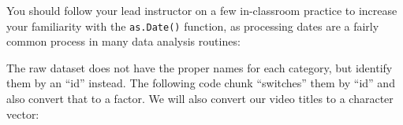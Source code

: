 \documentclass[]{article}
\newenvironment{Shaded}{\begin{snugshade}}{\end{snugshade}}
\newcommand{\CommentTok}[1]{\textcolor[rgb]{0.56,0.35,0.01}{\textit{#1}}}
\newcommand{\DataTypeTok}[1]{\textcolor[rgb]{0.13,0.29,0.53}{#1}}
\newcommand{\KeywordTok}[1]{\textcolor[rgb]{0.13,0.29,0.53}{\textbf{#1}}}
\newcommand{\NormalTok}[1]{#1}
\newcommand{\StringTok}[1]{\textcolor[rgb]{0.31,0.60,0.02}{#1}}
\begin{document}
You should follow your lead instructor on a few in-classroom practice to
increase your familiarity with the \texttt{as.Date()} function, as
processing dates are a fairly common process in many data analysis
routines:

\begin{Shaded}
\end{Shaded}

The raw dataset does not have the proper names for each category, but
identify them by an ``id'' instead. The following code chunk
``switches'' them by ``id'' and also convert that to a factor. We will
also convert our video titles to a character vector:
\end{document}
